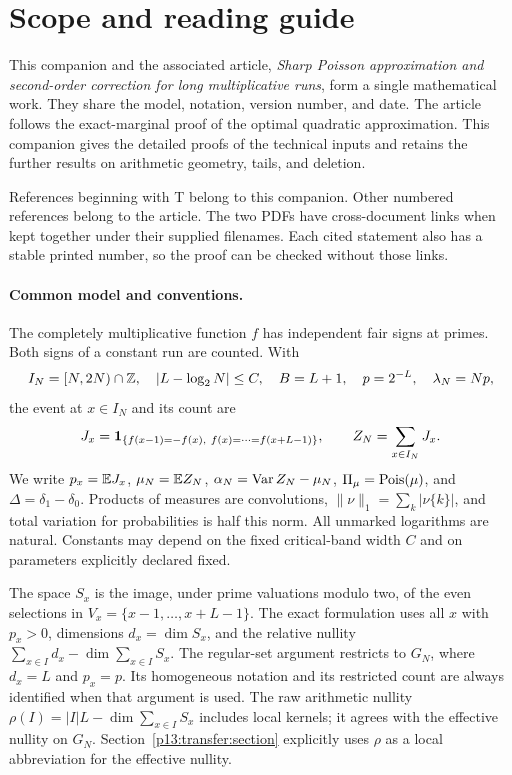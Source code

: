 \section*{Scope and reading guide}
\label{p14:comp:guide}

This companion and the associated article, \emph{Sharp Poisson
approximation and second-order correction for long multiplicative runs},
form a single mathematical work. They share the model, notation,
version number, and date. The article follows the exact-marginal
proof of the optimal quadratic approximation. This companion gives
the detailed proofs of the technical inputs and retains the further
results on arithmetic geometry, tails, and deletion.

References beginning with T belong to this companion. Other
numbered references belong to the article. The two PDFs have
cross-document links when kept together under their supplied
filenames. Each cited statement also has a stable printed number,
so the proof can be checked without those links.

\paragraph{Common model and conventions.}
The completely multiplicative function \(f\) has independent fair
signs at primes. Both signs of a constant run are counted. With
\[
 I_N=[N,2N)\cap\mathbb Z,\quad |L-\log_2N|\le C,\quad
 B=L+1,\quad p=2^{-L},\quad \lambda_N=Np,
\]
the event at \(x\in I_N\) and its count are
\[
 J_x=\ind_{\{f(x-1)=-f(x),\ f(x)=\cdots=f(x+L-1)\}},
 \qquad Z_N=\sum_{x\in I_N}J_x.
\]
We write \(p_x=\mathbb E J_x\), \(\mu_N=\mathbb E Z_N\),
\(\alpha_N=\operatorname{Var} Z_N-\mu_N\), \(\Pi_\mu=\operatorname{Pois}(\mu)\),
and \(\Delta=\delta_1-\delta_0\). Products of measures
are convolutions, \(\|\nu\|_1=\sum_k|\nu\{k\}|\),
and total variation for probabilities is half this norm.
All unmarked logarithms are natural. Constants may depend on
the fixed critical-band width \(C\) and on parameters explicitly
declared fixed.

The space \(S_x\) is the image, under prime valuations modulo two,
of the even selections in \(V_x=\{x-1,\ldots,x+L-1\}\).
The exact formulation uses all \(x\) with \(p_x>0\), dimensions
\(d_x=\dim S_x\), and the relative nullity
\(\sum_{x\in I}d_x-\dim\sum_{x\in I}S_x\).
The regular-set argument restricts to \(G_N\), where \(d_x=L\)
and \(p_x=p\). Its homogeneous notation and its restricted count
are always identified when that argument is used. The raw arithmetic
nullity \(\rho(I)=|I|L-\dim\sum_{x\in I}S_x\) includes local
kernels; it agrees with the effective nullity on \(G_N\).
Section~\ref{p13:transfer:section} explicitly uses \(\rho\)
as a local abbreviation for the effective nullity.

